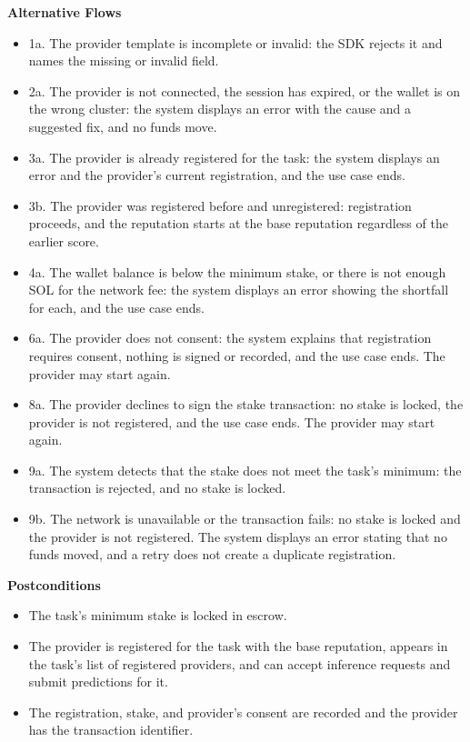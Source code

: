 \documentclass[12pt]{article}
\begin{document}
\textbf{Alternative Flows}
\begin{itemize}
\item 1a. The provider template is incomplete or invalid: the SDK rejects it and names the missing or invalid field.
\item 2a. The provider is not connected, the session has expired, or the wallet is on the wrong cluster: the system displays an error with the cause and a suggested fix, and no funds move.
\item 3a. The provider is already registered for the task: the system displays an error and the provider's current registration, and the use case ends.
\item 3b. The provider was registered before and unregistered: registration proceeds, and the reputation starts at the base reputation regardless of the earlier score.
\item 4a. The wallet balance is below the minimum stake, or there is not enough SOL for the network fee: the system displays an error showing the shortfall for each, and the use case ends.
\item 6a. The provider does not consent: the system explains that registration requires consent, nothing is signed or recorded, and the use case ends. The provider may start again.
\item 8a. The provider declines to sign the stake transaction: no stake is locked, the provider is not registered, and the use case ends. The provider may start again.
\item 9a. The system detects that the stake does not meet the task's minimum: the transaction is rejected, and no stake is locked.
\item 9b. The network is unavailable or the transaction fails: no stake is locked and the provider is not registered. The system displays an error stating that no funds moved, and a retry does not create a duplicate registration.
\end{itemize}

\textbf{Postconditions}
\begin{itemize}
\item The task's minimum stake is locked in escrow.
\item The provider is registered for the task with the base reputation, appears in the task's list of registered providers, and can accept inference requests and submit predictions for it.
\item The registration, stake, and provider's consent are recorded and the provider has the transaction identifier.
\end{itemize}
\end{document}
